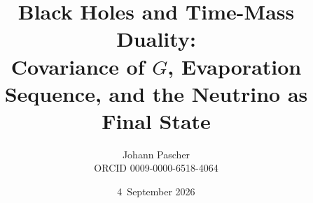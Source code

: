 \documentclass[11pt,a4paper]{report}
\title{Black Holes and Time-Mass Duality:\\[0.5em]
  \large Covariance of $G$, Evaporation Sequence, and the Neutrino as Final State}
\date{4~September 2026}
\author{Johann Pascher\\\small ORCID 0009-0000-6518-4064}
\begin{document}
\renewcommand{\thechapter}{}
\renewcommand{\thesection}{\arabic{section}}
\maketitle
\tableofcontents

\end{document}
